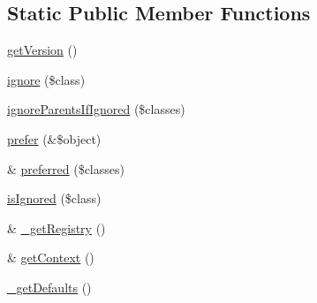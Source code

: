 \subsection*{Static Public Member Functions}
\begin{DoxyCompactItemize}
\item 
\hyperlink{class_simple_test_a98340f36ae1706e734230de930e7a054}{getVersion} ()
\item 
\hyperlink{class_simple_test_ad50fcd3215d2e5166c41bc73cef1bbe6}{ignore} (\$class)
\item 
\hyperlink{class_simple_test_af1f16dee501b6f17715087395b8f47cf}{ignoreParentsIfIgnored} (\$classes)
\item 
\hyperlink{class_simple_test_a5735c92069dd08a3ff5779a20fdef80e}{prefer} (\&\$object)
\item 
\& \hyperlink{class_simple_test_a22e57646468cee812ebe7c4a4443d567}{preferred} (\$classes)
\item 
\hyperlink{class_simple_test_a95bdcb7e0f83f70790ffc4566158824d}{isIgnored} (\$class)
\item 
\& \hyperlink{class_simple_test_a89b05bdd90acbaa574ea20d088e99b0f}{\_\-getRegistry} ()
\item 
\& \hyperlink{class_simple_test_ad88a0ca3dbedbac5471e1c29239f5f71}{getContext} ()
\item 
\hyperlink{class_simple_test_aca4dc7253ba3fb6593993372d955c5c4}{\_\-getDefaults} ()
\end{DoxyCompactItemize}


